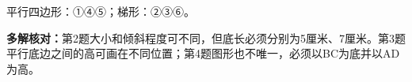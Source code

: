 
\begingroup\color{answerred}平行四边形：①④⑤；梯形：②③⑥。\par\endgroup
{}
\begingroup\color{answerred}\par\noindent\begin{center}\end{center}\par\endgroup
{}
\begingroup\color{answerred}\par\noindent\begin{center}\end{center}\par\endgroup
{}
\begingroup\color{answerred}\par\noindent\begin{center}\end{center}\par\endgroup

\begingroup\color{answerred}\textbf{多解核对：}第2题大小和倾斜程度可不同，但底长必须分别为5厘米、7厘米。第3题平行底边之间的高可画在不同位置；第4题图形也不唯一，必须以BC为底并以AD为高。\par\endgroup
